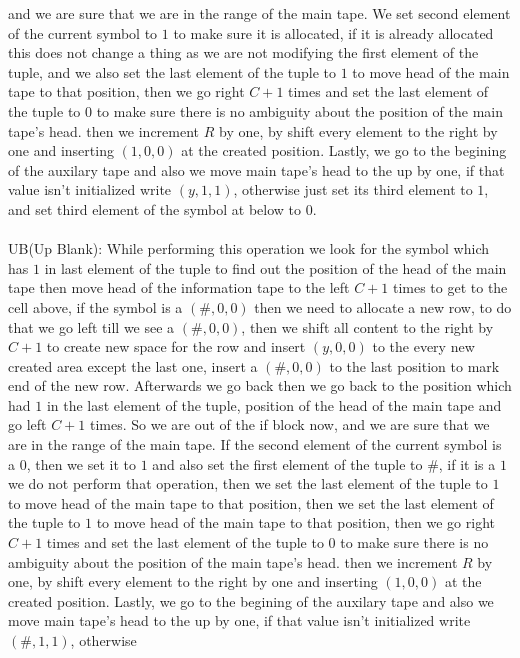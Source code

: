 \documentclass[12pt]{article}
\begin{document}
and we are sure that we are in the range of the main tape. We set second element of the current
symbol to $1$ to make sure it is allocated, if it is already allocated this does not change a thing
as we are not modifying the first element of the tuple, and we also set the last element of the
tuple to $1$ to move head of the main tape to that position, then we go right $C+1$ times and set the
last element of the tuple to $0$ to make sure there is no ambiguity about the position of the
main tape's head. then we increment $R$ by one, by shift every element to the right by one
and inserting $(1,0,0)$ at the created position. Lastly, we go to the begining of the auxilary tape
and also we move main tape's head to the up by one, if that value isn't initialized write $(y,1,1)$, otherwise
just set its third element to $1$, and set third element of the symbol at below to $0$.\\
\\
UB(Up Blank): While performing this operation we look for the symbol which has $1$ in
last element of the tuple to find out the position of the head of the main tape then move head 
of the information tape to the left $C+1$ times to get to the cell above, if the symbol is a $(\#,0,0)$
then we need to allocate a new row, to do that we go left till we see a $(\#,0,0)$, then 
we shift all content to the right by $C+1$ to create new space for the row and insert $(y,0,0)$ to the
every new created area except the last one, insert a $(\#,0,0)$ to the last position to mark end of the new row.
Afterwards we go back then we go back to the position which had $1$ in the last element of the tuple,
position of the head of the main tape and go left $C+1$ times. So we are out of the if block now,
and we are sure that we are in the range of the main tape. If the second element of the
current symbol is a $0$, then we set it to $1$ and also set the first element of the tuple to $\#$,
if it is a $1$ we do not perform that operation, then we set the last element of the
tuple to $1$ to move head of the main tape to that position, then we set the last element of the
tuple to $1$ to move head of the main tape to that position, then we go right $C+1$ times and set the
last element of the tuple to $0$ to make sure there is no ambiguity about the position of the
main tape's head. then we increment $R$ by one, by shift every element to the right by one
and inserting $(1,0,0)$ at the created position. Lastly, we go to the begining of the auxilary tape
and also we move main tape's head to the up by one, if that value isn't initialized write $(\#,1,1)$, otherwise
\end{document}
